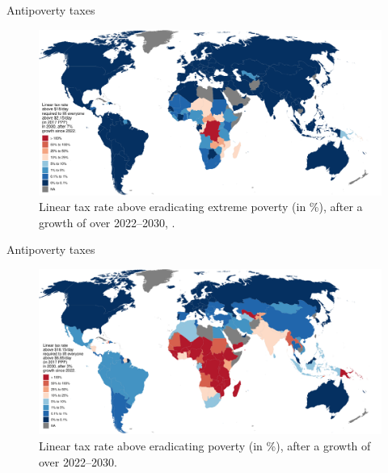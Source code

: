 \documentclass[aspectratio=169,xcolor=dvipsnames, 11pt,mathserif]{beamer}
\begin{document}
\begin{frame}{Antipoverty taxes}    
    \begin{figure}
      \caption{Linear tax rate above  eradicating extreme poverty (in \%), after a growth of  over 2022--2030, . 
      }
      \includegraphics[height=.8\textheight]{../figures/s_antipoverty_2_tax_18_very_optimistic.pdf}
    \end{figure}
\end{frame}

\begin{frame}{Antipoverty taxes}    
    \begin{figure}
      \caption{Linear tax rate above  eradicating  poverty (in \%), after a growth of  over 2022--2030. 
      }
      \includegraphics[height=.8\textheight]{../figures/antipoverty_7_tax_18_average.pdf}
    \end{figure}
\end{frame}
\end{document}
